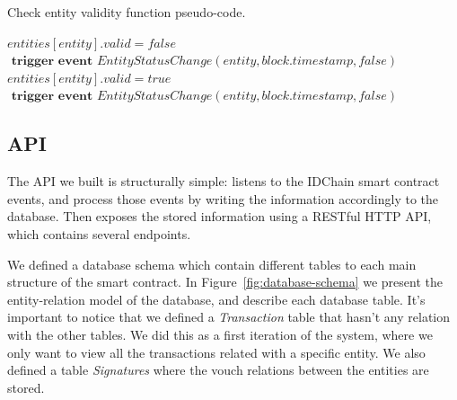 \begin{algorithm}
  \caption{Check entity validity function pseudo-code.}
  \label{alg:check-entity-validity}
  \begin{algorithmic}[1]
      \State $entities[entity].valid = false$
        \State {}
      \EndFor
      \State $\textbf{ trigger event } EntityStatusChange(entity, block.timestamp, false)$
    \EndIf
    \State
      \State $entities[entity].valid = true$
        \State {}
      \EndFor
      \State $\textbf{ trigger event } EntityStatusChange(entity, block.timestamp, false)$
    \EndIf
    \EndFunction
  \end{algorithmic}
\end{algorithm}


\subsection{API}\label{subsection:api}

The API we built is structurally simple: listens to the IDChain smart contract events, and process those events by writing the information accordingly to the database.
Then exposes the stored information using a RESTful HTTP API, which contains several endpoints.

We defined a database schema which contain different tables to each main structure of the smart contract.
In Figure~\ref{fig:database-schema} we present the entity-relation model of the database, and describe each database table.
It's important to notice that we defined a \textit{Transaction} table that hasn't any relation with the other tables.
We did this as a first iteration of the system, where we only want to view all the transactions related with a specific entity.
We also defined a table \textit{Signatures} where the vouch relations between the entities are stored.

